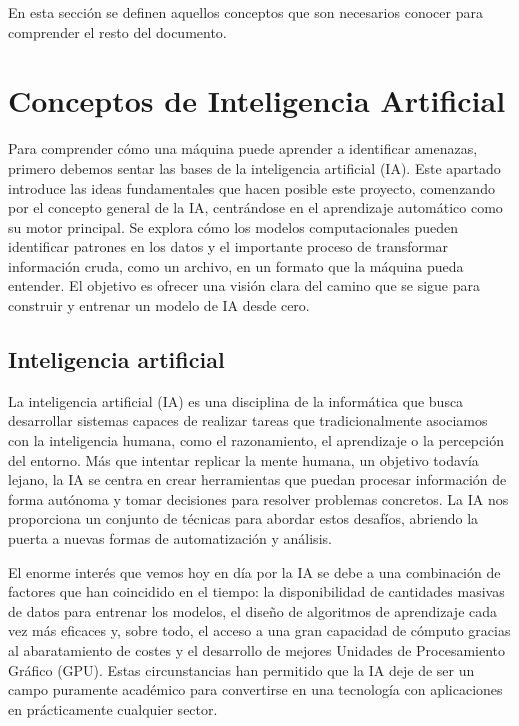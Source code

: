 
En esta sección se definen aquellos conceptos que son necesarios conocer para comprender el resto del documento.


\section{Conceptos de Inteligencia Artificial}

Para comprender cómo una máquina puede aprender a identificar amenazas, primero debemos sentar las bases de la inteligencia artificial (IA). Este apartado introduce las ideas fundamentales que hacen posible este proyecto, comenzando por el concepto general de la IA, centrándose en el aprendizaje automático como su motor principal. Se explora cómo los modelos computacionales pueden identificar patrones en los datos y el importante proceso de transformar información cruda, como un archivo, en un formato que la máquina pueda entender. El objetivo es ofrecer una visión clara del camino que se sigue para construir y entrenar un modelo de IA desde cero.

\subsection{Inteligencia artificial}

La inteligencia artificial (IA) es una disciplina de la informática que busca desarrollar sistemas capaces de realizar tareas que tradicionalmente asociamos con la inteligencia humana, como el razonamiento, el aprendizaje o la percepción del entorno. Más que intentar replicar la mente humana, un objetivo todavía lejano, la IA se centra en crear herramientas que puedan procesar información de forma autónoma y tomar decisiones para resolver problemas concretos. La IA nos proporciona un conjunto de técnicas para abordar estos desafíos, abriendo la puerta a nuevas formas de automatización y análisis.

El enorme interés que vemos hoy en día por la IA se debe a una combinación de factores que han coincidido en el tiempo: la disponibilidad de cantidades masivas de datos para entrenar los modelos, el diseño de algoritmos de aprendizaje cada vez más eficaces y, sobre todo, el acceso a una gran capacidad de cómputo gracias al abaratamiento de costes y el desarrollo de mejores Unidades de Procesamiento Gráfico (GPU). Estas circunstancias han permitido que la IA deje de ser un campo puramente académico para convertirse en una tecnología con aplicaciones en prácticamente cualquier sector.

